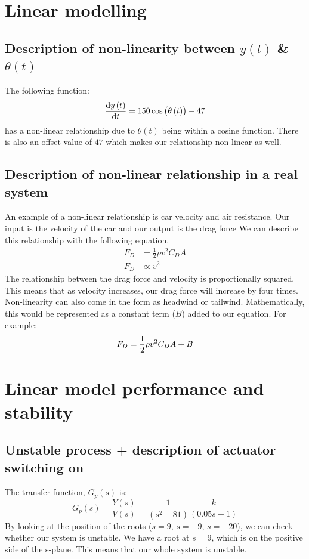 \documentclass[11pt]{article}
\numberwithin{equation}{section}
\begin{document}
\section{Linear modelling}
\subsection{Description of non-linearity between $y(t)$ \& $\theta(t)$}
The following function:
\begin{equation}
    \frac{\dif y\left( t\right)}{\dif t} = 150 \cos \left(\theta\left(t\right)\right) - 47
\end{equation}
has a non-linear relationship due to $\theta(t)$ being within a cosine function. There is also an offset value of $47$ which makes our relationship non-linear as well.
\subsection{Description of non-linear relationship in a real system}
An example of a non-linear relationship is car velocity and air resistance. Our input is the velocity of the car and our output is the drag force We can describe this relationship with the following equation.
\begin{align}
    F_D & = \frac{1}{2} \rho v^2 C_D A \\
    F_D & \propto v^2
\end{align}
The relationship between the drag force and velocity is proportionally squared. This means that as velocity increases, our drag force will increase by four times. Non-linearity can also come in the form as headwind or tailwind. Mathematically, this would be represented as a constant term ($B$) added to our equation. For example:
\begin{equation}
    F_D = \frac{1}{2} \rho v^2 C_D A + B\\
\end{equation}
\section{Linear model performance and stability}
\subsection{Unstable process + description of actuator switching on}
The transfer function, $G_p(s)$ is:
\begin{equation}
    G_p (s) = \frac{Y(s)}{V(s)} = \frac{1}{\left(s^2 - 81\right)}\frac{k}{\left(0.05s + 1\right)}
\end{equation}
By looking at the position of the roots ($s = 9$, $s = -9$, $s = -20$), we can check whether our system is unstable. We have a root at $s = 9$, which is on the positive side of the s-plane. This means that our whole system is unstable.
\end{document}
